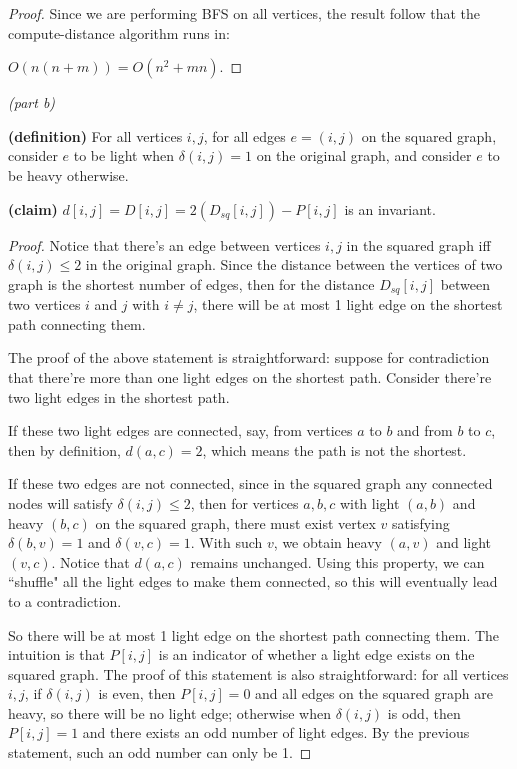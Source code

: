 \documentclass[a4paper, 10pt]{article}
\begin{document}
{\begin{proof}
Since we are performing BFS on all vertices, the result follow that the compute-distance algorithm runs in:

$O(n (n + m) ) = O(n^{2} + mn).$
\end{proof}

{\noindent\large\it(part b)}

\noindent\textbf{(definition)} For all vertices $i,j$, for all edges $e = (i,j)$ on the squared graph, consider $e$ to be light when $\delta(i,j) = 1$ on the original graph, and consider $e$ to be heavy otherwise. 

{\noindent\textbf{(claim)} 
$ d[i,j] = D [i,j] = 2( D_{sq} [i,j] ) - P [i,j]$ is an invariant.
}
\begin{proof}
Notice that there's an edge between vertices $i,j$ in the squared graph iff $\delta(i,j) \le 2$ in the original graph. Since the distance between the vertices of two graph is the shortest number of edges, then for the distance $D_{sq} [i,j]$ between two vertices $i$ and $j$ with $i \ne j$, there will be at most 1 light edge on the shortest path connecting them. 

The proof of the above statement is straightforward: suppose for contradiction that there're more than one light edges on the shortest path. Consider there're two light edges in the shortest path. 

If these two light edges are connected, say, from vertices $a$ to $b$ and from $b$ to $c$, then by definition, $d(a,c) = 2$, which means the path is not the shortest. 

If these two edges are not connected, since in the squared graph any connected nodes will satisfy $\delta(i,j) \le 2$, then for vertices $a,b,c$ with light $(a,b)$ and heavy $(b,c)$ on the squared graph, there must exist vertex $v$ satisfying $\delta(b,v) = 1$ and $\delta(v,c) = 1$. With such $v$, we obtain heavy $(a,v)$ and light $(v,c)$. Notice that $d(a,c)$ remains unchanged. Using this property, we can ``shuffle" all the light edges to make them connected, so this will eventually lead to a contradiction.

So there will be at most 1 light edge on the shortest path connecting them. The intuition is that $P [i,j]$ is an indicator of whether a light edge exists on the squared graph. The proof of this statement is also straightforward: for all vertices $i,j$, if $\delta(i,j)$ is even, then $P [i,j] = 0$ and all edges on the squared graph are heavy, so there will be no light edge; otherwise when $\delta(i,j)$ is odd, then $P [i,j] = 1$ and there exists an odd number of light edges. By the previous statement, such an odd number can only be 1.


\end{proof}}
\end{document}
